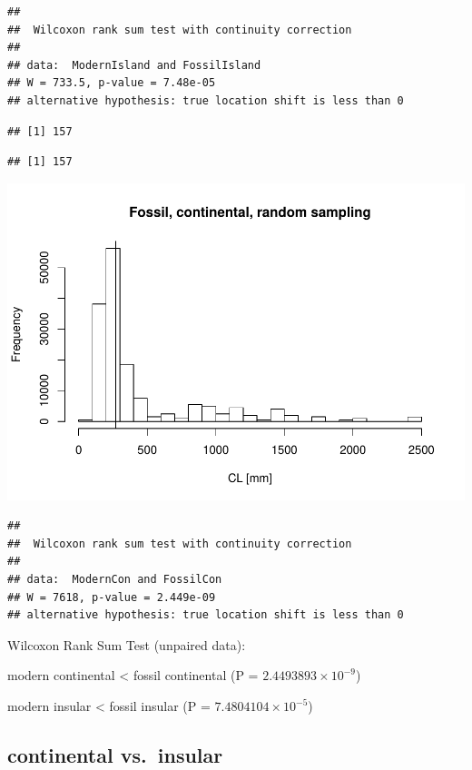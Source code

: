 \documentclass[]{article}
\begin{document}
\begin{verbatim}
## 
##  Wilcoxon rank sum test with continuity correction
## 
## data:  ModernIsland and FossilIsland
## W = 733.5, p-value = 7.48e-05
## alternative hypothesis: true location shift is less than 0
\end{verbatim}

\begin{verbatim}
## [1] 157
\end{verbatim}

\begin{verbatim}
## [1] 157
\end{verbatim}

\includegraphics{MA_JJ_files/figure-latex/RSMFCI-2.pdf}

\begin{verbatim}
## 
##  Wilcoxon rank sum test with continuity correction
## 
## data:  ModernCon and FossilCon
## W = 7618, p-value = 2.449e-09
## alternative hypothesis: true location shift is less than 0
\end{verbatim}

Wilcoxon Rank Sum Test (unpaired data):

modern continental \textless{} fossil continental (P =
\(2.4493893\times 10^{-9}\))

modern insular \textless{} fossil insular (P =
\(7.4804104\times 10^{-5}\))

\newpage

\subsection{continental vs.~insular}\label{continental-vs.insular-1}
\end{document}
